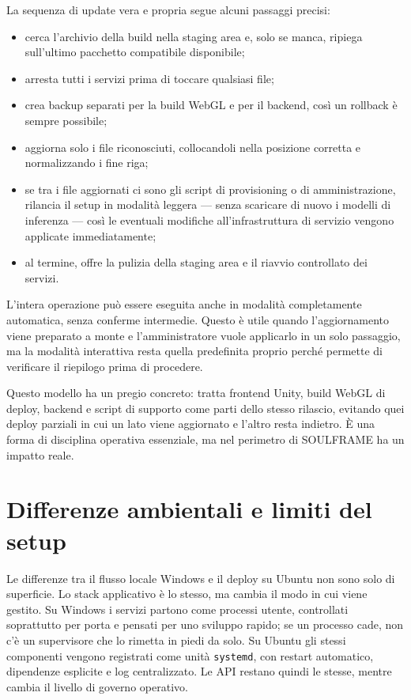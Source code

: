 La sequenza di update vera e propria segue alcuni passaggi precisi:
\begin{itemize}
\item cerca l'archivio della build nella staging area e, solo se manca, ripiega sull'ultimo pacchetto compatibile disponibile;
\item arresta tutti i servizi prima di toccare qualsiasi file;
\item crea backup separati per la build WebGL e per il backend, così un rollback è sempre possibile;
\item aggiorna solo i file riconosciuti, collocandoli nella posizione corretta e normalizzando i fine riga;
\item se tra i file aggiornati ci sono gli script di provisioning o di amministrazione, rilancia il setup in modalità leggera --- senza scaricare di nuovo i modelli di inferenza --- così le eventuali modifiche all'infrastruttura di servizio vengono applicate immediatamente;
\item al termine, offre la pulizia della staging area e il riavvio controllato dei servizi.
\end{itemize}

L'intera operazione può essere eseguita anche in modalità completamente automatica, senza conferme intermedie. Questo è utile quando l'aggiornamento viene preparato a monte e l'amministratore vuole applicarlo in un solo passaggio, ma la modalità interattiva resta quella predefinita proprio perché permette di verificare il riepilogo prima di procedere.

Questo modello ha un pregio concreto: tratta frontend Unity, build WebGL di deploy, backend e script di supporto come parti dello stesso rilascio, evitando quei deploy parziali in cui un lato viene aggiornato e l'altro resta indietro. È una forma di disciplina operativa essenziale, ma nel perimetro di SOULFRAME ha un impatto reale.

\section{Differenze ambientali e limiti del setup}
Le differenze tra il flusso locale Windows e il deploy su Ubuntu non sono solo di superficie. Lo stack applicativo è lo stesso, ma cambia il modo in cui viene gestito. Su Windows i servizi partono come processi utente, controllati soprattutto per porta e pensati per uno sviluppo rapido; se un processo cade, non c'è un supervisore che lo rimetta in piedi da solo. Su Ubuntu gli stessi componenti vengono registrati come unità \texttt{systemd}, con restart automatico, dipendenze esplicite e log centralizzato. Le API restano quindi le stesse, mentre cambia il livello di governo operativo.

